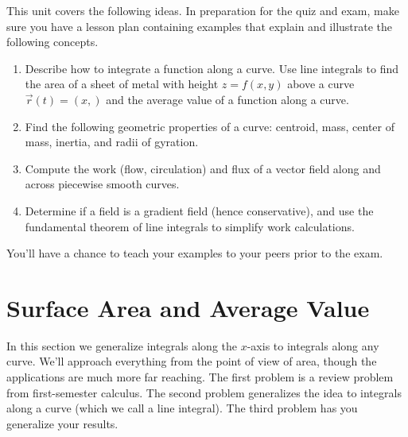 
\noindent 
This unit covers the following ideas. In preparation for the quiz and exam, make sure you have a lesson plan containing examples that explain and illustrate the following concepts.  
\begin{enumerate}
\item Describe how to integrate a function along a curve. Use line integrals to find the area of a sheet of metal with height $z=f(x,y)$ above a curve $\vec r(t)=\left(x,\right)$ and the average value of a function along a curve.
\item Find the following geometric properties of a curve: centroid, mass, center of mass, inertia, and radii of gyration.
\item Compute the work (flow, circulation) and flux of a vector field along and across piecewise smooth curves.
\item Determine if a field is a gradient field (hence conservative), and use the fundamental theorem of line integrals to simplify work calculations.
\end{enumerate}
You'll have a chance to teach your examples to your peers prior to the exam.

\section{Surface Area and Average Value}

In this section we generalize integrals along the $x$-axis to integrals along any curve. We'll approach everything from the point of view of area, though the applications are much more far reaching. The first problem is a review problem from first-semester calculus.  The second problem generalizes the idea to integrals along a curve (which we call a line integral). The third problem has you generalize your results.


